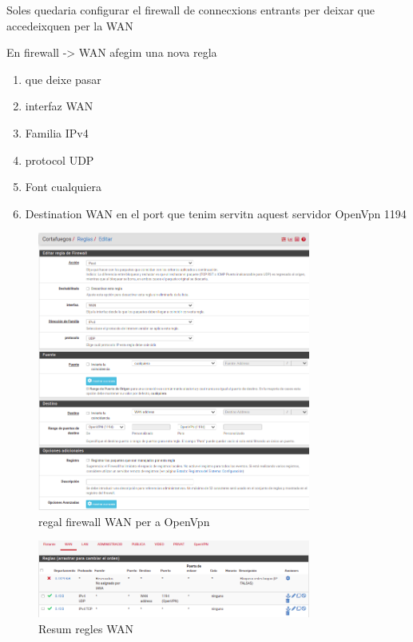 \documentclass[
  10pt,
]{krantz}
\providecommand{\tightlist}{%
  \setlength{\itemsep}{0pt}\setlength{\parskip}{0pt}}
\begin{document}
Soles quedaria configurar el firewall de connecxions entrants per deixar que accedeixquen per la WAN

En firewall -\textgreater{} WAN afegim una nova regla

\begin{enumerate}
\def\labelenumi{\arabic{enumi}.}
\tightlist
\item
  que deixe pasar
\item
  interfaz WAN
\item
  Familia IPv4
\item
  protocol UDP
\item
  Font cualquiera
\item
  Destination WAN en el port que tenim servitn aquest servidor OpenVpn 1194
\end{enumerate}

\begin{figure}
\centering
\includegraphics[width=0.8\textwidth,height=\textheight]{imatges/proxmox/regla_WAN_vpn_usuaris.png}
\caption{regal firewall WAN per a OpenVpn}
\end{figure}

\begin{figure}
\centering
\includegraphics[width=0.8\textwidth,height=\textheight]{imatges/proxmox/regl_wan_vpn_resum.png}
\caption{Resum regles WAN}
\end{figure}
\end{document}
